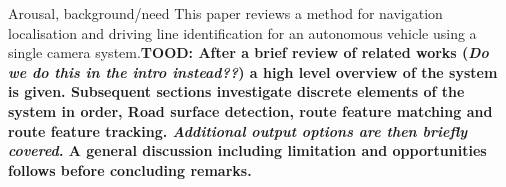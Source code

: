 \documentclass[]{aiaa-tc}%
\begin{document}
%

Arousal, background/need
This paper reviews a method for navigation localisation and driving line identification for an autonomous vehicle using a single camera system.\textbf{TOOD: After a brief review of related works (\textit{Do we do this in the intro instead??}) a high level overview of the system is given. Subsequent sections investigate discrete elements of the system in order, Road surface detection, route feature matching and route feature tracking. \textit{Additional output options are then briefly covered}. A general discussion including limitation and opportunities follows before concluding remarks.}
\end{document}
